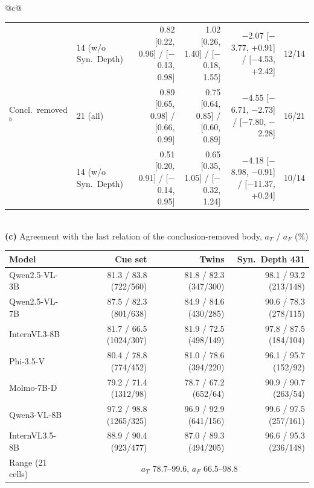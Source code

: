 \begin{tabular}{@{}c@{}}
\begin{tabular}{llrrrr}
 & 14 (w/o Syn.\ Depth) & 0.82 [0.22, 0.96] / [$-$0.13, 0.98] & 1.02 [0.26, 1.40] / [$-$0.18, 1.55] & $-$2.07 [$-$3.77, +0.91] / [$-$4.53, +2.42] & 12/14 \\
Concl.\ removed$^b$ & 21 (all) & 0.89 [0.65, 0.98] / [0.66, 0.99] & 0.75 [0.64, 0.85] / [0.60, 0.89] & $-$4.55 [$-$6.71, $-$2.73] / [$-$7.80, $-$2.28] & 16/21 \\
 & 14 (w/o Syn.\ Depth) & 0.51 [0.20, 0.91] / [$-$0.14, 0.95] & 0.65 [0.35, 1.05] / [$-$0.32, 1.24] & $-$4.18 [$-$8.98, $-$0.91] / [$-$11.37, +0.24] & 10/14 \\
\bottomrule
\end{tabular} \\[6pt]
\textbf{(c)} Agreement with the last relation of the conclusion-removed body, $a_T$ / $a_F$ (\%) \\[2pt]
\begin{tabular}{lrrr}
\toprule
Model & Cue set & Twins & Syn.\ Depth 431 \\
\midrule
Qwen2.5-VL-3B & 81.3 / 83.8 {\scriptsize (722/560)} & 81.8 / 82.3 {\scriptsize (347/300)} & 98.1 / 93.2 {\scriptsize (213/148)} \\
Qwen2.5-VL-7B & 87.5 / 82.3 {\scriptsize (801/638)} & 84.9 / 84.6 {\scriptsize (430/285)} & 90.6 / 78.3 {\scriptsize (278/115)} \\
InternVL3-8B & 81.7 / 66.5 {\scriptsize (1024/307)} & 81.9 / 72.5 {\scriptsize (498/149)} & 97.8 / 87.5 {\scriptsize (184/104)} \\
Phi-3.5-V & 80.4 / 78.8 {\scriptsize (774/452)} & 81.0 / 78.6 {\scriptsize (394/220)} & 96.1 / 95.7 {\scriptsize (152/92)} \\
Molmo-7B-D & 79.2 / 71.4 {\scriptsize (1312/98)} & 78.7 / 67.2 {\scriptsize (652/64)} & 90.9 / 90.7 {\scriptsize (263/54)} \\
Qwen3-VL-8B & 97.2 / 98.8 {\scriptsize (1265/325)} & 96.9 / 92.9 {\scriptsize (641/156)} & 99.6 / 97.5 {\scriptsize (257/161)} \\
InternVL3.5-8B & 88.9 / 90.4 {\scriptsize (923/477)} & 87.0 / 89.3 {\scriptsize (494/205)} & 96.6 / 95.3 {\scriptsize (236/148)} \\
\midrule
Range (21 cells) & \multicolumn{3}{c}{$a_T$ 78.7--99.6, $a_F$ 66.5--98.8} \\
\bottomrule
\end{tabular}
\end{tabular}
